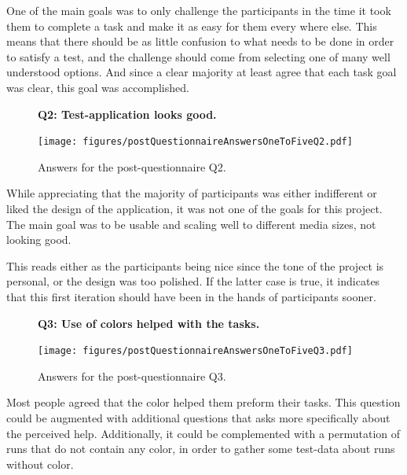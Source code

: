 \documentclass[nofilelist,dvipsnames]{cslthse-msc}
\begin{document}
{        One of the main goals was to only challenge the participants in the
        time it took them to complete a task and make it as easy for them every
        where else. This means that there should be as little confusion to what
        needs to be done in order to satisfy a test, and the challenge should
        come from selecting one of many well understood options. And since a
        clear majority at least agree that each task goal was clear, this goal
        was accomplished.

				\begin{figure}[h!]
          \textbf{Q2: Test-application looks good.}
          \begin{center}
            \texttt{[image: figures/postQuestionnaireAnswersOneToFiveQ2.pdf]}
            \vspace{-1cm}
            \caption{Answers for the post-questionnaire Q2.}
          \end{center}
				\end{figure}

        While appreciating that the majority of participants was either
        indifferent or liked the design of the application, it was not one of
        the goals for this project. The main goal was to be usable and scaling
        well to different media sizes, not looking good.

        This reads either as the participants being nice since the tone of the
        project is personal, or the design was too polished. If the latter case
        is true, it indicates that this first iteration should have been in the
        hands of participants sooner.

				\begin{figure}[h!]
          \textbf{Q3: Use of colors helped with the tasks.}
          \begin{center}
            \texttt{[image: figures/postQuestionnaireAnswersOneToFiveQ3.pdf]}
            \vspace{-1cm}
            \caption{Answers for the post-questionnaire Q3.}
          \end{center}
				\end{figure}

        Most people agreed that the color helped them preform their tasks.
        This question could be augmented with additional questions that asks
        more specifically about the perceived help. Additionally, it could be
        complemented with a permutation of runs that do not contain any color,
        in order to gather some test-data about runs without color.

}
\end{document}
